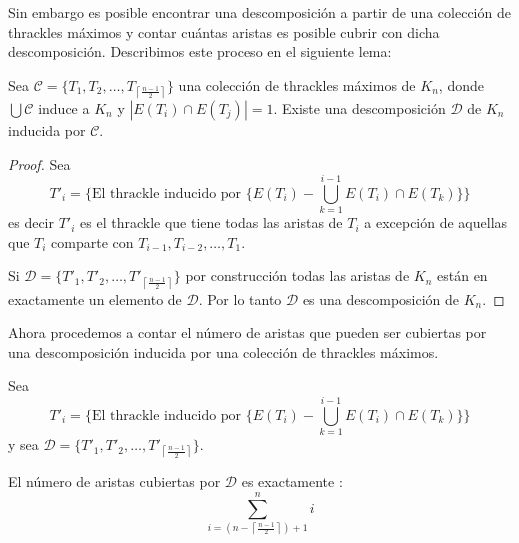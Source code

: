 Sin embargo es posible encontrar una descomposición a partir de una colección de thrackles
máximos y contar cuántas aristas es posible cubrir con dicha descomposición. Describimos
este proceso en el siguiente lema:
\begin{lemma}\label{lema:existedescomp}
  Sea $\mathcal{C}=\{T_1,T_2,\dots,T_{\left\lceil\frac{n-1}{2}\right\rceil}\}$ una colección
  de thrackles máximos de $K_n$, donde $\bigcup\mathcal{C}$ induce a $K_n$ y $|E(T_i)\cap E(T_j)| = 1$.
  Existe una descomposición $\mathcal{D}$ de $K_n$ inducida por $\mathcal{C}$.
\end{lemma}
\begin{proof}
  Sea \[T'_i = \{\text{El thrackle inducido por } \{E(T_i) - \bigcup_{k=1}^{i-1} E(T_i)\cap E(T_k)\} \}\]
  es decir $T'_i$ es el thrackle que tiene todas las aristas de $T_i$
  a excepción de aquellas que $T_i$ comparte con $T_{i-1},T_{i-2},\dots,T_{1}$.

  Si $\mathcal{D}=\{T'_1,T'_2,\dots,T'_{\left\lceil\frac{n-1}{2}\right\rceil}\}$ por construcción todas las aristas de $K_n$ están en
  exactamente un elemento de $\mathcal{D}$. Por lo tanto $\mathcal{D}$ es una descomposición de $K_n$.
\end{proof}
Ahora procedemos a contar el número de aristas que pueden ser cubiertas por una descomposición
inducida por una colección de thrackles máximos.
\begin{lemma}
  Sea \[T'_i = \{\text{El thrackle inducido por } \{E(T_i) - \bigcup_{k=1}^{i-1} E(T_i)\cap E(T_k)\} \}\]
  y sea  $\mathcal{D}=\{T'_1,T'_2,\dots,T'_{\left\lceil\frac{n-1}{2}\right\rceil}\}.$

  El número de aristas cubiertas por $\mathcal{D}$ es exactamente :
   \[\displaystyle \sum^n_{i=\left(n-\left\lceil\frac{n-1}{2}\right\rceil\right) + 1}i\]
 \end{lemma}
